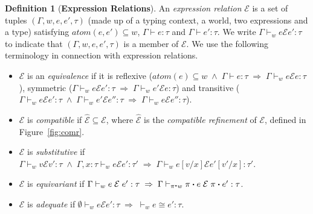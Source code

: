 \documentclass{LMCS}
\theoremstyle{plain}
\theoremstyle{definition}
\newtheorem{definition}[thm]{Definition}
\newcommand{\act}{\mathbin{\mbox{\boldmath$\cdot$}}}
\newcommand{\atoms}{\mathit{atom}}
\renewcommand{\conj}{\wedge}
\newcommand{\CR}[1]{\mathrel{\widehat{#1}}}
\newcommand{\ent}{\vdash}
\newcommand{\enty}{\vdash}
\newcommand{\er}{\mathrel{\mathcal{E}}}
\renewcommand{\exp}[1][e]{#1}
\newcommand{\imp}{\Rightarrow}
\newcommand{\ofty}{:}
\newcommand{\opeq}{\cong}
\newcommand{\sub}[2]{{[#2/#1]}}
\newcommand{\ty}{\tau}
\newcommand{\val}[1][v]{#1}
\newcommand{\vid}[1][x]{#1}
\newcommand{\w}[1][w]{#1}
\begin{document}
\begin{definition}[\textbf{Expression Relations}]
  \label{def:expr}
  An \emph{expression relation} $\er$ is a set of tuples
  $(\Gamma,\w,\exp,\exp',\ty)$ (made up of a typing context, a world,
  two expressions and a type) satisfying
  $\atoms(\exp,\exp')\subseteq\w$, $\Gamma\enty \exp\ofty\ty$ and
  $\Gamma\enty \exp'\ofty\ty$. We write $\Gamma\ent_{\w} \exp\er \exp'
  \ofty\ty$ to indicate that $(\Gamma,\w,\exp,\exp',\ty)$ is a member
  of $\er$.  We use the following terminology in connection with
  expression relations.
  \begin{itemize}

  \item $\er$ is an \emph{equivalence} if it is reflexive
    ($\atoms(\exp)\subseteq\w \;\conj\; \Gamma\enty\exp\ofty\ty
    \;\imp\; \Gamma\ent_{\w}\exp\er\exp\ofty\ty$), symmetric
    ($\Gamma\ent_{\w}\exp\er\exp'\ofty\ty \;\imp\;
    \Gamma\ent_{\w}\exp'\er\exp\ofty\ty$) and transitive
    ($\Gamma\ent_{\w}\exp\er\exp'\ofty\ty \;\conj\;
    \Gamma\ent_{\w}\exp'\er\exp''\ofty\ty \;\imp\;
    \Gamma\ent_{\w}\exp\er\exp''\ofty\ty$).
    
  \item $\er$ is \emph{compatible} if ${\CR{\er}}\subseteq{\er}$,
    where $\CR{\er}$ is the \emph{compatible refinement} of $\er$,
    defined in Figure~\ref{fig:comr}.
    
  \item $\er$ is \emph{substitutive} if
    $\Gamma\ent_{\w}\val\er\val'\ofty\ty \;\conj\;
    \Gamma,\vid\ofty\ty\ent_{\w}\exp\er\exp'\ofty\ty' \;\imp\;
    \Gamma\ent_{\w}
    \exp\sub{\vid}{\val}\er\exp'\sub{\vid}{\val'}\ofty\ty'$.
    
  \item $\er$ is \emph{equivariant} if
    $\Gamma\ent_{\w}\exp\er\exp'\ofty\ty \;\imp\;
    \Gamma\ent_{\pi\act\w}\pi\act\exp\er\pi\act\exp'\ofty\ty$.
    
  \item $\er$ is \emph{adequate} if
    $\emptyset\ent_{\w}\exp\er\exp'\ofty\ty\;\imp\;
    {}\ent_{\w}\exp\opeq\exp'\ofty\ty$.
  \end{itemize}
\end{definition}
\end{document}

